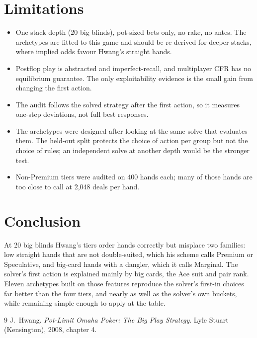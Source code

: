 \documentclass[10pt]{article}
\begin{document}
\section{Limitations}
\begin{itemize}
\item One stack depth (20 big blinds), pot-sized bets only, no rake, no antes. The archetypes are
fitted to this game and should be re-derived for deeper stacks, where implied odds favour Hwang's
straight hands.
\item Postflop play is abstracted and imperfect-recall, and multiplayer CFR has no equilibrium
guarantee. The only exploitability evidence is the small gain from changing the first action.
\item The audit follows the solved strategy after the first action, so it measures one-step
deviations, not full best responses.
\item The archetypes were designed after looking at the same solve that evaluates them. The
held-out split protects the choice of action per group but not the choice of rules; an independent
solve at another depth would be the stronger test.
\item Non-Premium tiers were audited on 400 hands each; many of those hands are too close to call at
2{,}048 deals per hand.
\end{itemize}

\section{Conclusion}
At 20 big blinds Hwang's tiers order hands correctly but misplace two families: low straight hands
that are not double-suited, which his scheme calls Premium or Speculative, and big-card hands with
a dangler, which it calls Marginal. The solver's first action is explained mainly by big cards, the
Ace suit and pair rank. Eleven archetypes built on those features reproduce the solver's first-in
choices far better than the four tiers, and nearly as well as the solver's own buckets, while
remaining simple enough to apply at the table.

\begin{thebibliography}{9}
 J.~Hwang. \emph{Pot-Limit Omaha Poker: The Big Play Strategy}. Lyle Stuart
(Kensington), 2008, chapter 4.
\end{thebibliography}
\end{document}
